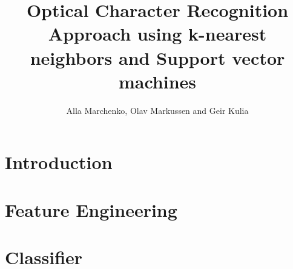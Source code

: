 \documentclass{article}
\begin{document}
\title{\huge Optical Character Recognition \\ \small{Approach using k-nearest neighbors and Support vector machines}}

\author{Alla Marchenko, Olav Markussen and Geir Kulia}

\maketitle

\section{Introduction}
	\label{sec:intro}
	

\section{Feature Engineering}
	\label{sec:fe}
	

\section{Classifier}
	\label{sec:class}

{}

\end{document}
